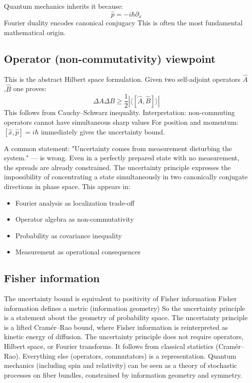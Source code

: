 Quantum mechanics inherits it because:
\[ \hat p=-i \hbar \partial_x \]
Fourier duality encodes canonical conjugacy
This is often the most fundamental mathematical origin.

\subsection{ Operator (non-commutativity) viewpoint}
This is the abstract Hilbert space formulation.
Given two self-adjoint operators $ \hat A $,$ \hat B $ 
 one proves:
\[ 
\Delta A \Delta B \ge \frac{1}{2} |\langle [\hat A,\hat B] \rangle|
\]
This follows from Cauchy–Schwarz inequality.
Interpretation: non-commuting operators cannot have simultaneous sharp values
For position and momentum: $ [\hat x,\hat p]=i\hbar $
 immediately gives the uncertainty bound.

A common  statement:
"Uncertainty comes from measurement disturbing the system."
--- is wrong.
Even in a perfectly prepared state with no measurement, the 
spreads are already constrained.
The uncertainty principle expresses the impossibility of concentrating a
state simultaneously in two canonically conjugate directions in phase
space. This appears in:
\begin{itemize}
   \item Fourier analysis as localization trade-off
   \item Operator algebra as non-commutativity
   \item Probability as covariance inequality
   \item Measurement as operational consequences
\end{itemize}

\subsection{Fisher information}
The uncertainty bound is equivalent to positivity of Fisher information
Fisher information defines a metric (information geometry)
So the uncertainty principle is a statement about the geometry of probability space.
The uncertainty principle is a lifted Cramér–Rao bound, where Fisher information 
is reinterpreted as kinetic energy of diffusion.
The uncertainty principle does not require operators, Hilbert space, or Fourier transforms.
It follows from classical statistics (Cramér–Rao).
Everything else (operators, commutators) is a representation.
Quantum mechanics (including spin and relativity) can be seen as a 
theory of stochastic processes on fiber bundles, constrained by
information geometry and symmetry.

